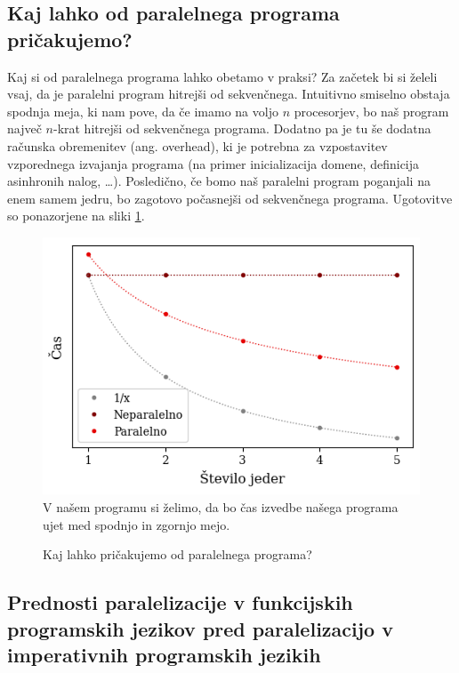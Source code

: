 \documentclass[mat1, tisk]{fmfdelo}
\begin{document}
\subsection{Kaj lahko od paralelnega programa pričakujemo?}

Kaj si od paralelnega programa lahko obetamo v praksi? Za začetek bi si želeli vsaj, da je paralelni program hitrejši
od sekvenčnega.  Intuitivno smiselno obstaja spodnja meja, ki nam pove, da če imamo na voljo $n$ procesorjev,
bo naš program največ $n$-krat hitrejši od sekvenčnega programa.
Dodatno pa je tu še dodatna računska obremenitev (ang. overhead), ki je potrebna za vzpostavitev vzporednega izvajanja
programa (na primer inicializacija domene, definicija asinhronih nalog, \dots). 
Posledično, če bomo naš paralelni program poganjali na enem samem jedru, bo 
zagotovo počasnejši od sekvenčnega programa. Ugotovitve so ponazorjene na sliki
\ref{fig:cilj-casovne-zahtevnosti-paralelizacije}.

\begin{figure}[h!]
  \centering
  \caption{Kaj lahko pričakujemo od paralelnega programa?}
  \includegraphics[width=13cm]{slike/cilj-casovne-zahtevnosti-paralelizacije.png}
  \label{fig:cilj-casovne-zahtevnosti-paralelizacije}
  \smallskip
  \footnotesize{V našem programu si želimo, da bo čas izvedbe našega programa ujet med spodnjo in zgornjo mejo.}
\end{figure}

\subsection{Prednosti paralelizacije v funkcijskih programskih jezikov pred paralelizacijo v imperativnih programskih jezikih}
\end{document}
